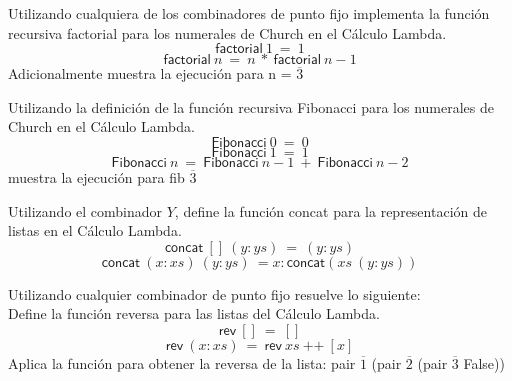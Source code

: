                 \begin{exercise}
                    Utilizando cualquiera de los combinadores de punto fijo implementa la función recursiva \textsf{factorial} para los numerales de Church en el Cálculo Lambda.
                    \[ \textsf{factorial}\ 1\ =\ 1 \]
                    \[ \textsf{factorial}\ n\ =\ n\ *\ \textsf{factorial}\ n-1\]
                    Adicionalmente muestra la ejecución para n = $\overline{3}$
                \end{exercise}



                \begin{exercise}
                    Utilizando la definición de la función recursiva \textsf{Fibonacci} para los numerales de Church en el Cálculo Lambda.
                    \[ \textsf{Fibonacci}\ 0\ =\ 0 \]
                    \[ \textsf{Fibonacci}\ 1\ =\ 1 \]
                    \[ \textsf{Fibonacci}\ n\ =\ \textsf{Fibonacci}\ n-1\ +\ \textsf{Fibonacci}\ n-2\]
                    muestra la ejecución para \textsf{fib $\overline{3}$}
                \end{exercise}



                \begin{exercise}
                    Utilizando el combinador $Y$, define la función \textsf{concat} para la representación de listas en el Cálculo Lambda.
                    \[
                        \textsf{concat}\ []\ (y:ys)\ =\ (y:ys)
                    \]
                    \[
                        \textsf{concat}\ (x:xs)\ (y:ys)\ = x:\textsf{concat}(xs\ (y:ys))
                    \]
                \end{exercise}



                \begin{exercise}
                    Utilizando cualquier combinador de punto fijo resuelve lo siguiente:\\
                    
                    Define la función reversa para las listas del Cálculo Lambda. \\
                    \[
                        \textsf{rev}\ []\ =\ []
                    \]
                    \[
                        \textsf{rev}\ (x:xs)\ =\ \textsf{rev}\ xs\ \text{++}\ [x]
                    \]
                    Aplica la función para obtener la reversa de la lista: \textsf{pair $\overline{1}$ (pair $\overline{2}$ (pair $\overline{3}$ False))}
                \end{exercise}



